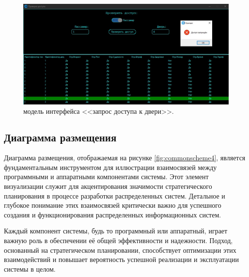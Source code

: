 \begin{figure} [ht]
	\centering
	\includegraphics[width=1\linewidth]{images/Example3}
	\caption{модель интерфейса <<запрос доступа к двери>>.}
	\label{fig:example3}
\end{figure}


\subsection{Диаграмма размещения}
Диаграмма размещения, отображаемая на рисунке \ref{fig:commonscheme4}, является фундаментальным инструментом для иллюстрации взаимосвязей между программными и аппаратными компонентами системы. Этот элемент визуализации служит для акцентирования значимости стратегического планирования
в процессе разработки распределенных систем. Детальное и глубокое понимание этих взаимосвязей критически важно для успешного создания и функционирования распределенных информационных систем.

Каждый компонент системы, будь то программный или аппаратный, играет важную роль в обеспечении её общей эффективности и надежности.
Подход, основанный на стратегическом планировании, способствует оптимизации этих взаимодействий и повышает вероятность успешной реализации и эксплуатации системы в целом.

